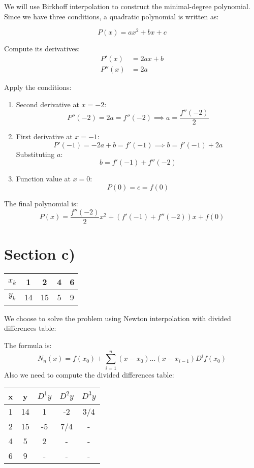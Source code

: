 \documentclass{article}
\begin{document}
We will use Birkhoff interpolation to construct the minimal-degree polynomial. Since we have three conditions, a quadratic polynomial is written as:

\[ P(x) = ax^2 + bx + c \]

Compute its derivatives:
\begin{align*}
    P'(x) &= 2ax + b \\
    P''(x) &= 2a
\end{align*}

Apply the conditions:
\begin{enumerate}
    \item Second derivative at \( x = -2 \):
    \[ P''(-2) = 2a = f''(-2) \implies a = \frac{f''(-2)}{2} \]

    \item First derivative at \( x = -1 \):
    \[ P'(-1) = -2a + b = f'(-1) \implies b = f'(-1) + 2a \]
    Substituting \( a \):
    \[ b = f'(-1) + f''(-2) \]

    \item Function value at \( x = 0 \):
    \[ P(0) = c = f(0) \]
\end{enumerate}

The final polynomial is:
\[ P(x) = \frac{f''(-2)}{2}x^2 + \left(f'(-1) + f''(-2)\right)x + f(0) \]

\section*{Section c)}
\begin{center}
    \begin{tabular}{c| c c c c}
        \(x_k\) & 1 & 2 & 4 & 6 \\
        \hline
        \(y_k\) & 14 & 15 & 5 & 9 \\
    \end{tabular}
\end{center}
We choose to solve the problem using Newton interpolation with divided differences table:

The formula is:
\[
    N_n(x) = f(x_0) + \sum_{i=1}^{n} (x - x_0) ... (x-x_{i-1}) D^if(x_0)
\]
Also we need to compute the divided differences table:
\begin{center}
    \begin{tabular}{c| c c c c}
        x & y & \(D^1y\) & \(D^2y\) & \(D^3y\) \\
        \hline
        1 & 14 & 1 & -2 & 3/4 \\
        2 & 15 & -5 & 7/4 &  -\\
        4 & 5 & 2 & - & - \\
        6 & 9 & - & - & - \\
    \end{tabular}
\end{center}
\end{document}

